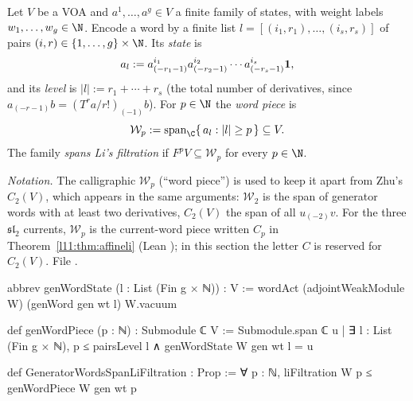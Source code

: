 \begin{definition}\label{l11:def:genwordpiece}
Let $V$ be a VOA and $a^1,\dots,a^g\in V$ a finite family of states, with weight labels $w_1,\dots,w_g\in\N$. Encode
a word by a finite list $l = [(i_1,r_1),\dots,(i_s,r_s)]$ of pairs $(i,r)\in\{1,\dots,g\}\times\N$. Its
\emph{state} is
\begin{equation*}
  a_l := a^{i_1}_{(-r_1-1)}a^{i_2}_{(-r_2-1)}\cdots a^{i_s}_{(-r_s-1)}\mathbf{1} ,
\end{equation*}
and its \emph{level} is $|l| := r_1+\cdots+r_s$ (the total number of derivatives, since
$a_{(-r-1)}b = (T^ra/r!)_{(-1)}b$). For $p\in\N$ the \emph{word piece} is
\begin{equation*}
  \mathcal W_p := \operatorname{span}_\C\{\,a_l : |l|\ge p\,\}\subseteq V .
\end{equation*}
The family \emph{spans Li's filtration} if $F^pV\subseteq \mathcal W_p$ for every $p\in\N$.
\end{definition}
\noindent\emph{Notation.} The calligraphic $\mathcal W_p$ (``word piece'') is used to keep it apart from Zhu's
$C_2(V)$, which appears in the same arguments: $\mathcal W_2$ is the span of generator words with at least two
derivatives, $C_2(V)$ the span of all $u_{(-2)}v$. For the three $\mathfrak{sl}_2$ currents, $\mathcal W_p$ is the
current-word piece written $C_p$ in Theorem~\ref{l11:thm:affineli} (Lean ); in this section the
letter $C$ is reserved for $C_2(V)$.
\noindent File .
\begin{leancode}
abbrev genWordState (l : List (Fin g × ℕ)) : V :=
  wordAct (adjointWeakModule W) (genWord gen wt l) W.vacuum

def genWordPiece (p : ℕ) : Submodule ℂ V :=
  Submodule.span ℂ {u | ∃ l : List (Fin g × ℕ), p ≤ pairsLevel l ∧ genWordState W gen wt l = u}

def GeneratorWordsSpanLiFiltration : Prop :=
  ∀ p : ℕ, liFiltration W p ≤ genWordPiece W gen wt p
\end{leancode}


